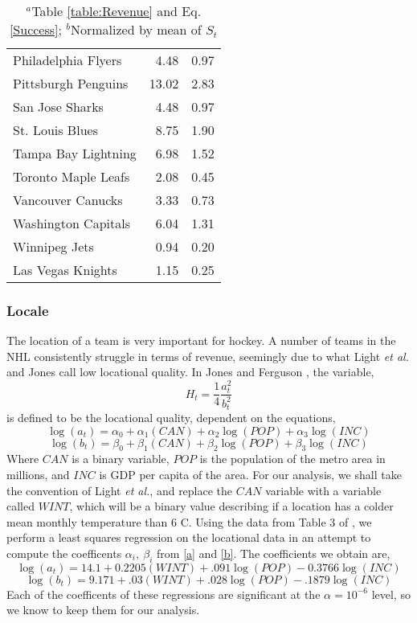 \documentclass[11pt]{report}            %
\begin{document}
\begin{table}[ht]
\begin{tabular}{lrr}
Philadelphia Flyers & 4.48 & 0.97 \\ 
Pittsburgh Penguins & 13.02 & 2.83 \\ 
San Jose Sharks & 4.48 & 0.97 \\ 
St. Louis Blues & 8.75 & 1.90 \\ 
Tampa Bay Lightning & 6.98 & 1.52 \\ 
Toronto Maple Leafs & 2.08 & 0.45 \\ 
Vancouver Canucks & 3.33 & 0.73 \\ 
Washington Capitals & 6.04 & 1.31 \\ 
Winnipeg Jets & 0.94 & 0.20 \\ 
Las Vegas Knights & 1.15 & 0.25 \\ 
\hline
\end{tabular}
\caption{$^a$Table \ref{table:Revenue} and Eq. \ref{Success}; $^b$Normalized by mean of $S_t$}
\label{table:St}
\end{table}
\subsubsection*{Locale}
The location of a team is very important for hockey. A number of teams in the NHL consistently struggle in terms of revenue, seemingly due to what Light \textit{et al.} and Jones call low locational quality\cite{light}\cite{jones}. In Jones and Ferguson \cite{jones}, the variable,
\begin{equation}\label{ht}
H_t=\frac{1}{4}\frac{a_t^2}{b_t^2}
\end{equation}
is defined to be the locational quality, dependent on the equations,
\begin{equation}\label{a}
\log(a_t) = \alpha_0+\alpha_1(CAN)+\alpha_2\log(POP)+\alpha_3\log(INC)
\end{equation}
\begin{equation}\label{b}
\log(b_t) = \beta_0+\beta_1(CAN)+\beta_2\log(POP)+\beta_3\log(INC)
\end{equation}
Where $CAN$ is a binary variable, $POP$ is the population of the metro area in millions, and $INC$ is GDP per capita of the area. For our analysis, we shall take the convention of Light \textit{et al.}, and replace the $CAN$ variable with a variable called $WINT$, which will be a binary value describing if a location has a colder mean monthly temperature than 6 \degree C. Using the data from Table 3 of \cite{light}, we perform a least squares regression on the locational data in an attempt to compute the coefficents $\alpha_i,\ \beta_i$ from \ref{a} and \ref{b}. The coefficients we obtain are,
\begin{equation}\label{acoeff}
\log(a_t) = 14.1 + 0.2205(WINT)+.091\log(POP)-0.3766\log(INC)
\end{equation}
\begin{equation}\label{bcoeff}
\log(b_t) = 9.171 + .03(WINT)+.028\log(POP)-.1879\log(INC)
\end{equation}
Each of the coefficents of these regressions are significant at the $\alpha=10^{-6}$ level, so we know to keep them for our analysis.
\end{document}
